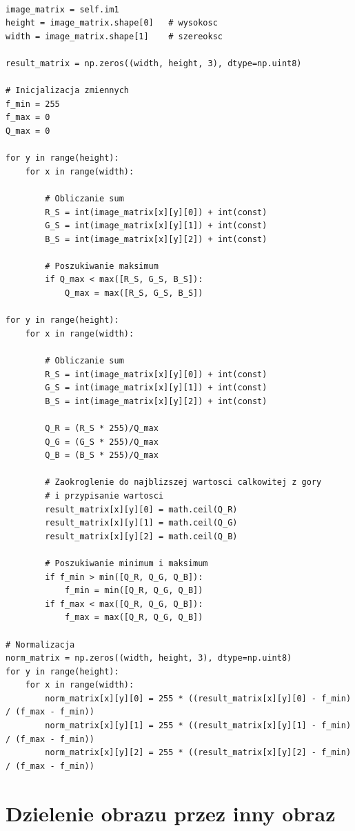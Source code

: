 \documentclass[final,a4paper,openany,12pt]{mwbk}
\begin{document}
\begin{lstlisting}[caption=  Dzielenie obrazu barwowego przez (zadaną) liczbę]

image_matrix = self.im1
height = image_matrix.shape[0]   # wysokosc
width = image_matrix.shape[1]    # szereoksc

result_matrix = np.zeros((width, height, 3), dtype=np.uint8)

# Inicjalizacja zmiennych
f_min = 255
f_max = 0
Q_max = 0

for y in range(height):
    for x in range(width):  

        # Obliczanie sum
        R_S = int(image_matrix[x][y][0]) + int(const)
        G_S = int(image_matrix[x][y][1]) + int(const)
        B_S = int(image_matrix[x][y][2]) + int(const)

        # Poszukiwanie maksimum
        if Q_max < max([R_S, G_S, B_S]):
            Q_max = max([R_S, G_S, B_S])

for y in range(height):
    for x in range(width):  

        # Obliczanie sum
        R_S = int(image_matrix[x][y][0]) + int(const)
        G_S = int(image_matrix[x][y][1]) + int(const)
        B_S = int(image_matrix[x][y][2]) + int(const)

        Q_R = (R_S * 255)/Q_max
        Q_G = (G_S * 255)/Q_max
        Q_B = (B_S * 255)/Q_max
            
        # Zaokroglenie do najblizszej wartosci calkowitej z gory
        # i przypisanie wartosci
        result_matrix[x][y][0] = math.ceil(Q_R)
        result_matrix[x][y][1] = math.ceil(Q_G)
        result_matrix[x][y][2] = math.ceil(Q_B)

        # Poszukiwanie minimum i maksimum                
        if f_min > min([Q_R, Q_G, Q_B]):
            f_min = min([Q_R, Q_G, Q_B])
        if f_max < max([Q_R, Q_G, Q_B]):
            f_max = max([Q_R, Q_G, Q_B])

# Normalizacja
norm_matrix = np.zeros((width, height, 3), dtype=np.uint8)
for y in range(height):
    for x in range(width):
        norm_matrix[x][y][0] = 255 * ((result_matrix[x][y][0] - f_min) / (f_max - f_min))
        norm_matrix[x][y][1] = 255 * ((result_matrix[x][y][1] - f_min) / (f_max - f_min))
        norm_matrix[x][y][2] = 255 * ((result_matrix[x][y][2] - f_min) / (f_max - f_min))

\end{lstlisting}

\section{ Dzielenie obrazu przez inny obraz }
\end{document}

